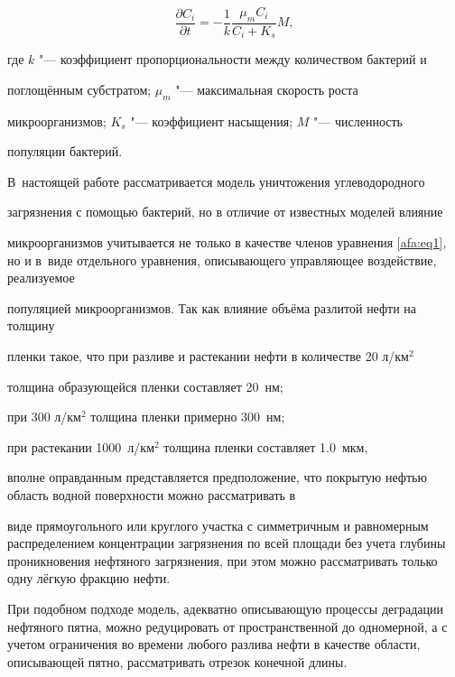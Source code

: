 \begin{equation}

\label{afa:eq3}

\frac{\partial C_i}{\partial t}=-\frac{1}{k}\frac{\mu _m C_i}{C_i+K_s }M,

\end{equation}

где $k$ "--- коэффициент пропорциональности между количеством бактерий и

поглощённым субстратом;  $\mu_m$ "--- максимальная скорость роста

микроорганизмов; $K_s$ "--- коэффициент насыщения; $M$ "--- численность

популяции бактерий.



\smallskip




В~настоящей работе рассматривается модель уничтожения углеводородного

загрязнения с помощью бактерий, но в отличие от известных моделей влияние

микроорганизмов учитывается не только в качестве членов уравнения \eqref{afa:eq1}, но и  в~виде отдельного уравнения, описывающего управляющее воздействие, реализуемое

популяцией микроорганизмов. Так как влияние объёма разлитой нефти на толщину

пленки такое, что при разливе и растекании нефти в количестве 20 л/км$^2$

толщина образующейся пленки составляет 20~нм; 

при 300 л/км$^2$ толщина пленки примерно 300~нм; 

при растекании 1000~л/км$^2$ толщина пленки составляет 1.0~мкм, 

вполне оправданным представляется предположение, что покрытую нефтью область водной поверхности можно рассматривать в

виде прямоугольного или круглого участка с симметричным и равномерным распределением концентрации загрязнения по всей площади без учета глубины проникновения нефтяного загрязнения,  при этом можно рассматривать только одну лёгкую фракцию нефти. 

При подобном подходе модель, адекватно описывающую процессы деградации нефтяного пятна, можно редуцировать от пространственной до одномерной, а с учетом ограничения во времени любого разлива нефти в качестве области, описывающей пятно, рассматривать отрезок конечной длины. 

